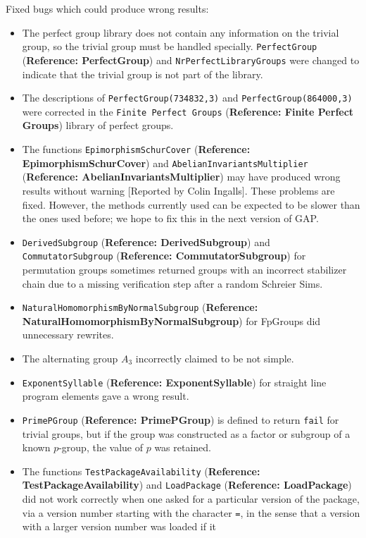 \documentclass[a4paper,11pt]{report}
\begin{document}
{{ Fixed bugs which could produce wrong results: 
\begin{itemize}
\item  The perfect group library does not contain any information on the trivial
group, so the trivial group must be handled specially. \texttt{PerfectGroup} (\textbf{Reference: PerfectGroup}) and \texttt{NrPerfectLibraryGroups} were changed to indicate that the trivial group is not part of the library. 
\item  The descriptions of \texttt{PerfectGroup(734832,3)} and \texttt{PerfectGroup(864000,3)} were corrected in the \texttt{Finite Perfect Groups} (\textbf{Reference: Finite Perfect Groups}) library of perfect groups. 
\item  The functions \texttt{EpimorphismSchurCover} (\textbf{Reference: EpimorphismSchurCover}) and \texttt{AbelianInvariantsMultiplier} (\textbf{Reference: AbelianInvariantsMultiplier}) may have produced wrong results without warning [Reported by Colin Ingalls].
These problems are fixed. However, the methods currently used can be expected
to be slower than the ones used before; we hope to fix this in the next
version of \textsf{GAP}. 
\item  \texttt{DerivedSubgroup} (\textbf{Reference: DerivedSubgroup}) and \texttt{CommutatorSubgroup} (\textbf{Reference: CommutatorSubgroup}) for permutation groups sometimes returned groups with an incorrect stabilizer
chain due to a missing verification step after a random Schreier Sims. 
\item  \texttt{NaturalHomomorphismByNormalSubgroup} (\textbf{Reference: NaturalHomomorphismByNormalSubgroup}) for FpGroups did unnecessary rewrites. 
\item  The alternating group $A_3$ incorrectly claimed to be not simple. 
\item  \texttt{ExponentSyllable} (\textbf{Reference: ExponentSyllable}) for straight line program elements gave a wrong result. 
\item  \texttt{PrimePGroup} (\textbf{Reference: PrimePGroup}) is defined to return \texttt{fail} for trivial groups, but if the group was constructed as a factor or subgroup
of a known $p$-group, the value of $p$ was retained. 
\item  The functions \texttt{TestPackageAvailability} (\textbf{Reference: TestPackageAvailability}) and \texttt{LoadPackage} (\textbf{Reference: LoadPackage}) did not work correctly when one asked for a particular version of the package,
via a version number starting with the character \texttt{=}, in the sense that a version with a larger version number was loaded if it

\end{itemize}}}
\end{document}
